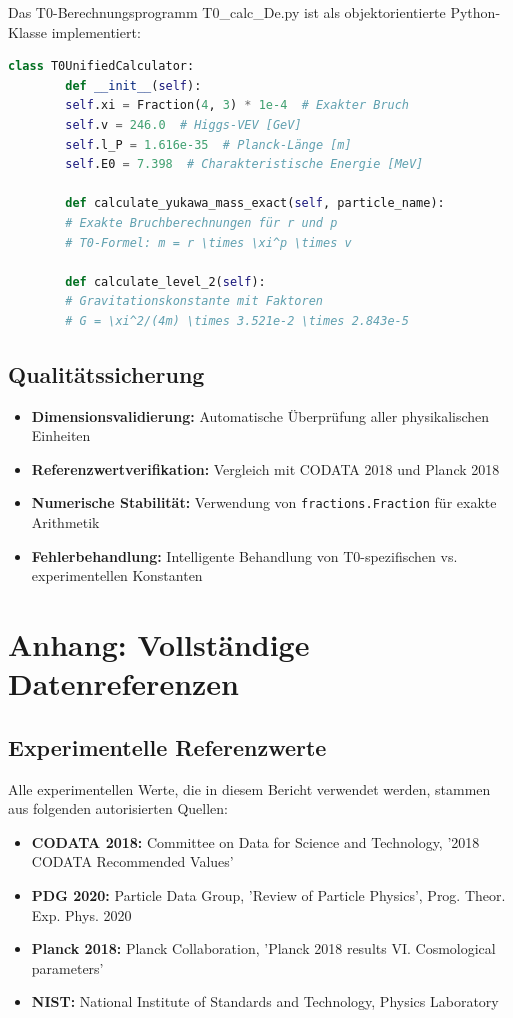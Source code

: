 	Das T0-Berechnungsprogramm T0\_calc\_De.py ist als objektorientierte Python-Klasse implementiert:
	
	\begin{lstlisting}[language=Python, basicstyle=\small\ttfamily]
		class T0UnifiedCalculator:
		def __init__(self):
		self.xi = Fraction(4, 3) * 1e-4  # Exakter Bruch
		self.v = 246.0  # Higgs-VEV [GeV]
		self.l_P = 1.616e-35  # Planck-Länge [m]
		self.E0 = 7.398  # Charakteristische Energie [MeV]
		
		def calculate_yukawa_mass_exact(self, particle_name):
		# Exakte Bruchberechnungen für r und p
		# T0-Formel: m = r \times \xi^p \times v
		
		def calculate_level_2(self):
		# Gravitationskonstante mit Faktoren
		# G = \xi^2/(4m) \times 3.521e-2 \times 2.843e-5
	\end{lstlisting}
	
	\subsection{Qualitätssicherung}
	
	\begin{itemize}
		\item \textbf{Dimensionsvalidierung:} Automatische Überprüfung aller physikalischen Einheiten
		\item \textbf{Referenzwertverifikation:} Vergleich mit CODATA 2018 und Planck 2018
		\item \textbf{Numerische Stabilität:} Verwendung von \texttt{fractions.Fraction} für exakte Arithmetik
		\item \textbf{Fehlerbehandlung:} Intelligente Behandlung von T0-spezifischen vs. experimentellen Konstanten
	\end{itemize}
	
	\section{Anhang: Vollständige Datenreferenzen}
	
	\subsection{Experimentelle Referenzwerte}
	
	Alle experimentellen Werte, die in diesem Bericht verwendet werden, stammen aus folgenden autorisierten Quellen:
	
	\begin{itemize}
		\item \textbf{CODATA 2018:} Committee on Data for Science and Technology, '2018 CODATA Recommended Values'
		\item \textbf{PDG 2020:} Particle Data Group, 'Review of Particle Physics', Prog. Theor. Exp. Phys. 2020
		\item \textbf{Planck 2018:} Planck Collaboration, 'Planck 2018 results VI. Cosmological parameters'
		\item \textbf{NIST:} National Institute of Standards and Technology, Physics Laboratory
	\end{itemize}
	
